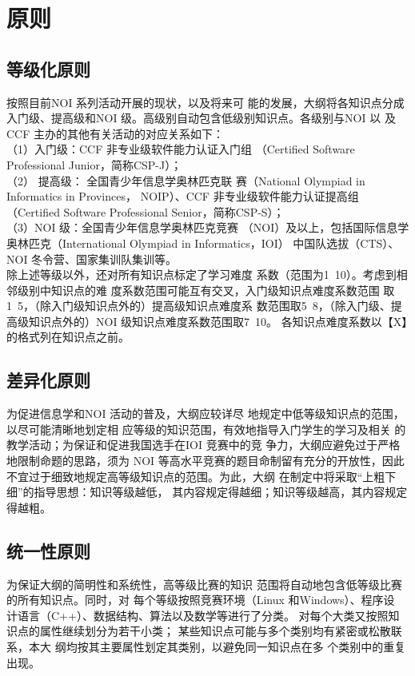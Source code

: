 \documentclass[12pt,twiside,a4paper]{ctexbook}
\numberwithin{chapter}{part}
\begin{document}
\section{原则}
\subsection{等级化原则}
按照目前NOI 系列活动开展的现状，以及将来可
能的发展，大纲将各知识点分成入门级、提高级和NOI
级。高级别自动包含低级别知识点。各级别与NOI 以
及CCF 主办的其他有关活动的对应关系如下：\\
（1）入门级：CCF 非专业级软件能力认证入门组
（Certified Software Professional Junior，简称CSP-J）；\\
（2） 提高级： 全国青少年信息学奥林匹克联
赛（National Olympiad in Informatics in Provinces，
NOIP）、CCF 非专业级软件能力认证提高组（Certified
Software Professional Senior，简称CSP-S）；\\
（3）NOI 级：全国青少年信息学奥林匹克竞赛
（NOI）及以上，包括国际信息学奥林匹克（International
Olympiad in Informatics，IOI） 中国队选拔（CTS）、
NOI 冬令营、国家集训队集训等。\\
除上述等级以外，还对所有知识点标定了学习难度
系数（范围为1~10）。考虑到相邻级别中知识点的难
度系数范围可能互有交叉，入门级知识点难度系数范围
取1~5，（除入门级知识点外的）提高级知识点难度系
数范围取5~8，（除入门级、提高级知识点外的）NOI
级知识点难度系数范围取7~10。
各知识点难度系数以【X】的格式列在知识点之前。
\subsection{差异化原则}
为促进信息学和NOI 活动的普及，大纲应较详尽
地规定中低等级知识点的范围，以尽可能清晰地划定相
应等级的知识范围，有效地指导入门学生的学习及相关
的教学活动；为保证和促进我国选手在IOI 竞赛中的竞
争力，大纲应避免过于严格地限制命题的思路，须为
NOI 等高水平竞赛的题目命制留有充分的开放性，因此
不宜过于细致地规定高等级知识点的范围。为此，大纲
在制定中将采取“上粗下细”的指导思想：知识等级越低，
其内容规定得越细；知识等级越高，其内容规定得越粗。
\subsection{统一性原则}
为保证大纲的简明性和系统性，高等级比赛的知识
范围将自动地包含低等级比赛的所有知识点。同时，对
每个等级按照竞赛环境（Linux 和Windows）、程序设
计语言（C++）、数据结构、算法以及数学等进行了分类。
对每个大类又按照知识点的属性继续划分为若干小类；
某些知识点可能与多个类别均有紧密或松散联系，本大
纲均按其主要属性划定其类别，以避免同一知识点在多
个类别中的重复出现。
\end{document}
